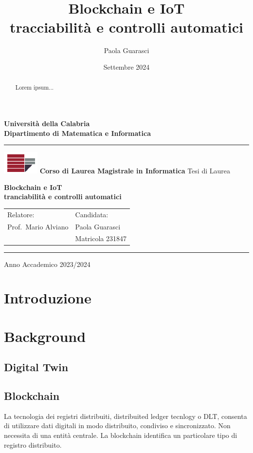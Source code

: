 \documentclass[a4paper,11pt]{article}
\title{Blockchain e IoT \\ tracciabilità e controlli automatici}
\author{Paola Guarasci}
\date{Settembre 2024}
\begin{document}
\begin{titlepage}
  \begin{center}
    \textbf{\LARGE Universit\`a della Calabria}\\
    \textbf{Dipartimento di Matematica e Informatica}\\
    \vskip 6pt
    \hrule
    \vskip 8pt
    \includegraphics{./img/logo_unical.png}
    \vskip 8pt
    \textbf{Corso di Laurea Magistrale in Informatica}
    \vskip 32pt
    Tesi di Laurea

    \vskip 70pt
      { \huge \bfseries Blockchain e IoT \\ tranciabilità e controlli automatici}\\[0.4cm]
    \vskip 150pt

    \begin{tabular}{p{8cm}p{8cm}}
      Relatore:           & Candidata:       \\
      Prof.~Mario Alviano & Paola Guarasci   \\
                          & Matricola 231847 \\
    \end{tabular}

    \vskip 76pt
    \hrule
    \vskip 5pt
    Anno Accademico 2023/2024
    \vfill
  \end{center}

\end{titlepage}
\clearpage
\tableofcontents
\clearpage
\begin{abstract}
  Lorem ipsum...
\end{abstract}
\section{Introduzione}
\section{Background}

\subsection{Digital Twin}

\subsection{Blockchain}
La tecnologia dei registri distribuiti, distribuited ledger tecnlogy o DLT, consenta di utilizzare dati digitali in modo distribuito, condiviso e sincronizzato. Non necessita di una entità centrale. La blockchain identifica un particolare tipo di registro distribuito.
\end{document}

